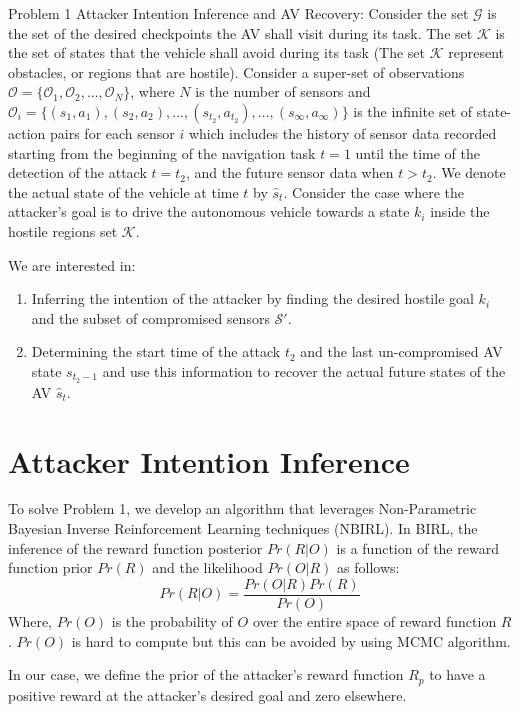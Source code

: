 \documentclass[conference]{IEEEtran}
\begin{document}
Problem 1 Attacker Intention Inference and AV Recovery: Consider the set $\mathcal{G}$ is the set of the desired checkpoints the AV shall visit during its task. The set $\mathcal{K}$ is the set of states that the vehicle shall avoid during its task (The set  $\mathcal{K}$ represent obstacles, or regions that are hostile). Consider a super-set of observations $\mathcal{O} = \{\mathcal{O}_1, \mathcal{O}_2, ..., \mathcal{O}_N\}$, where $N$ is the number of sensors and $\mathcal{O}_i = \{(s_1, a_1), (s_2, a_2), ... , (s_{t_2}, a_{t_2}), ... , (s_\infty, a_\infty)\}$ is the infinite set of state-action pairs for each sensor $i$ which includes the history of sensor data recorded starting from the beginning of the navigation task $t = 1$ until the time of the detection of the attack $t = t_2$, and the future sensor data when $t > t_2$. We denote the actual state of the vehicle at time $t$ by $\hat{s}_t$. Consider the case where the attacker's goal is to drive the autonomous vehicle towards a state $k_i$ inside the hostile regions set $\mathcal{K}$.

We are interested in:
\begin{enumerate}
    \item Inferring the intention of the attacker by finding the desired hostile goal $k_i$ and the subset of compromised sensors $\mathcal{S'}$.
    \item Determining the start time of the attack $t_2$ and the last un-compromised AV state $s_{t_2-1}$ and use this information to recover the actual future states of the AV $\hat{s}_t$.
\end{enumerate}

\section{Attacker Intention Inference}\label{sec:intpredic}
To solve Problem 1, we develop an algorithm that leverages Non-Parametric Bayesian Inverse Reinforcement Learning techniques (NBIRL). In BIRL, the inference of the reward function posterior $Pr(R|O)$ is a function of the reward function prior $Pr(R)$ and the likelihood $Pr(O|R)$ as follows:
\[ 
    Pr(R|O) = \frac{Pr(O|R)Pr(R)}{Pr(O)}
\]
Where, $Pr(O)$ is the probability of $O$ over the entire space of reward function $R$. $Pr(O)$ is hard to compute but this can be avoided by using MCMC algorithm.

In our case, we define the prior of the attacker's reward function $R_p$ to have a positive reward at the attacker's desired goal and zero elsewhere. 
\end{document}
